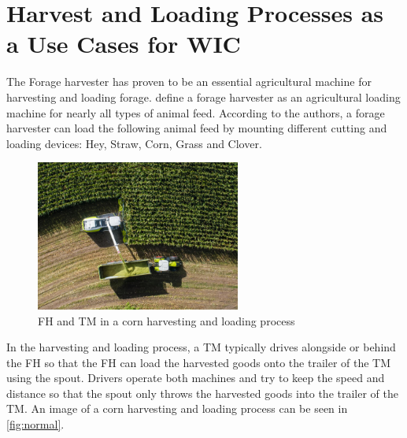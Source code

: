 \section[\acl{WIC} Use Cases]{Harvest and Loading Processes as a Use Cases for \acl{WIC}}
The Forage harvester has proven to be an essential agricultural machine for harvesting and loading forage. \textcite{seifert_feldhacksler_1962} define a forage harvester
as an agricultural loading machine for nearly all types of animal feed. According to the authors, a forage harvester can load the following animal feed by mounting different cutting and loading devices: Hey, Straw, Corn, Grass and Clover.
\begin{figure}%
	\centering
	\includegraphics[width=0.6\textwidth]{figures/claas_harvest_side.png}
	\caption{\acf{FH} and \acf{TM} in a corn harvesting and loading process}%
	\label{fig:normal}%
\end{figure}

In the harvesting and loading process, a \ac{TM} typically drives alongside or behind the \ac{FH} so that the \ac{FH} can load the harvested goods onto the trailer of the \ac{TM} using the spout. Drivers operate both machines and try to keep the speed and distance so that the spout only throws the harvested goods into the trailer of the TM. An image of a corn harvesting and loading process can be seen in \autoref{fig:normal}.

